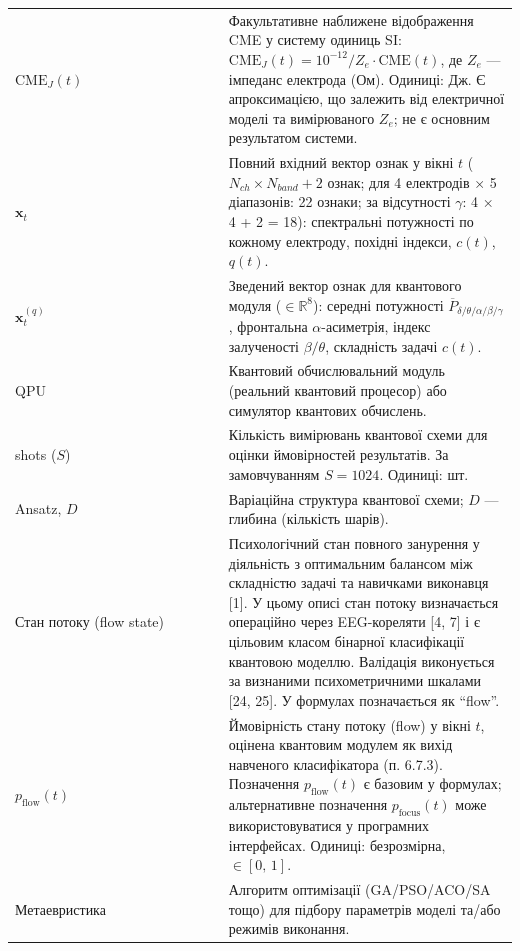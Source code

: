 \documentclass[12pt,a4paper]{article}
\begin{document}
{\begin{longtable}[]{@{}

  >{\raggedright\arraybackslash}p{0.4211\linewidth}

  >{\raggedright\arraybackslash}p{0.5789\linewidth}@{}}
\(\text{CME}_J(t)\) & Факультативне наближене відображення CME у систему одиниць SI: \(\text{CME}_J(t) = 10^{-12} / Z_e \cdot \text{CME}(t)\), де \(Z_e\) --- імпеданс електрода (Ом). Одиниці: Дж. Є апроксимацією, що залежить від електричної моделі та вимірюваного \(Z_e\); не є основним результатом системи. \\

\(\mathbf{x}_t\) & Повний вхідний вектор ознак у вікні \(t\) (\(N_{ch} \times N_{band} + 2\) ознак; для 4 електродів × 5 діапазонів: 22 ознаки; за відсутності \(\gamma\): 4 × 4 + 2 = 18): спектральні потужності по кожному електроду, похідні індекси, \(c(t)\), \(q(t)\). \\

\(\mathbf{x}_t^{(q)}\) & Зведений вектор ознак для квантового модуля (\(\in \mathbb{R}^8\)): середні потужності \(\overline{P}_{\delta/\theta/\alpha/\beta/\gamma}\), фронтальна \(\alpha\)-асиметрія, індекс залученості \(\beta/\theta\), складність задачі \(c(t)\). \\

QPU & Квантовий обчислювальний модуль (реальний квантовий процесор) або симулятор квантових обчислень. \\

shots (\(S\)) & Кількість вимірювань квантової схеми для оцінки ймовірностей результатів. За замовчуванням \(S = 1024\). Одиниці: шт. \\

Ansatz, \(D\) & Варіаційна структура квантової схеми; \(D\) --- глибина (кількість шарів). \\

Стан потоку (flow state) & Психологічний стан повного занурення у діяльність з оптимальним балансом між складністю задачі та навичками виконавця {[}1{]}. У цьому описі стан потоку визначається операційно через EEG-кореляти {[}4, 7{]} і є цільовим класом бінарної класифікації квантовою моделлю. Валідація виконується за визнаними психометричними шкалами {[}24, 25{]}. У формулах позначається як ``flow''. \\

\(p_{\text{flow}}(t)\) & Ймовірність стану потоку (flow) у вікні \(t\), оцінена квантовим модулем як вихід навченого класифікатора (п. 6.7.3). Позначення \(p_{\text{flow}}(t)\) є базовим у формулах; альтернативне позначення \(p_\text{focus}(t)\) може використовуватися у програмних інтерфейсах. Одиниці: безрозмірна, \(\in [0,\,1]\). \\

Метаевристика & Алгоритм оптимізації (GA/PSO/ACO/SA тощо) для підбору параметрів моделі та/або режимів виконання. \\


\end{longtable}}
\end{document}
